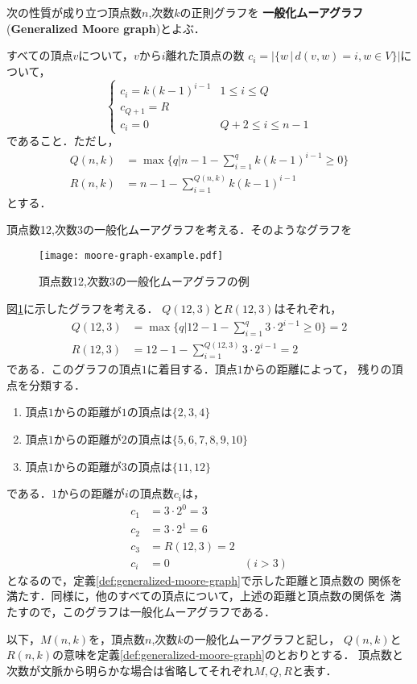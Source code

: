 \begin{definition}
  \label{def:generalized-moore-graph}
  次の性質が成り立つ頂点数$n$,次数$k$の正則グラフを
  \textbf{一般化ムーアグラフ}(\textbf{Generalized Moore graph})とよぶ．

  すべての頂点$v$について，$v$から$i$離れた頂点の数
  $c_i = \lvert\{ w\,|\,d(v,w) = i , w\in V \}\rvert$について，
  \[ \begin{cases}
    c_i = k(k-1)^{i-1} & 1\leq i\leq Q \\
    c_{Q+1} = R & \\
    c_i = 0 & Q+2\leq i \leq n-1
  \end{cases} \]
  であること．ただし，
  \begin{align*}
    Q(n,k) &= \max\{q | n-1-\sum_{i=1}^{q}k(k-1)^{i-1} \geq 0\} \\
    R(n,k) &= n - 1 - \sum_{i=1}^{Q(n,k)}k(k-1)^{i-1}
  \end{align*}
  とする．
\end{definition}
\begin{example}
  頂点数12,次数3の一般化ムーアグラフを考える．そのようなグラフを
  \begin{figure}
    \centering
    \texttt{[image: moore-graph-example.pdf]}
    \caption{頂点数12,次数3の一般化ムーアグラフの例}
    \label{fig:moore-graph-example}
  \end{figure}
  図\ref{fig:moore-graph-example}に示したグラフを考える．
  $Q(12,3)$と$R(12,3)$はそれぞれ，
  \begin{align*}
    Q(12,3) &= \max\{q | 12-1-\sum_{i=1}^{q}3\cdot2^{i-1} \geq 0\} = 2 \\
    R(12,3) &= 12 - 1 - \sum_{i=1}^{Q(12,3)}3\cdot2^{i-1} = 2
  \end{align*}
  である．このグラフの頂点$1$に着目する．頂点$1$からの距離によって，
  残りの頂点を分類する．
  \begin{enumerate}
  \item 頂点$1$からの距離が$1$の頂点は$\{2,3,4\}$
  \item 頂点$1$からの距離が$2$の頂点は$\{5,6,7,8,9,10\}$
  \item 頂点$1$からの距離が$3$の頂点は$\{11,12\}$
  \end{enumerate}
  である．$1$からの距離が$i$の頂点数$c_i$は，
  \begin{align*}
  c_1 &= 3\cdot2^0 = 3 & \\
  c_2 &= 3\cdot2^1 = 6 & \\
  c_3 &= R(12,3) = 2 & \\
  c_i &= 0 & (i>3)
  \end{align*}
  となるので，定義\ref{def:generalized-moore-graph}で示した距離と頂点数の
  関係を満たす．同様に，他のすべての頂点について，上述の距離と頂点数の関係を
  満たすので，このグラフは一般化ムーアグラフである．
\end{example}
以下，$M(n,k)$を，頂点数$n$,次数$k$の一般化ムーアグラフと記し，
$Q(n,k)$と$R(n,k)$の意味を定義\ref{def:generalized-moore-graph}のとおりとする．
頂点数と次数が文脈から明らかな場合は省略してそれぞれ$M,Q,R$と表す．

